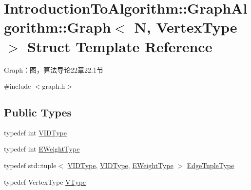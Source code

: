 \hypertarget{struct_introduction_to_algorithm_1_1_graph_algorithm_1_1_graph}{}\section{Introduction\+To\+Algorithm\+:\+:Graph\+Algorithm\+:\+:Graph$<$ N, Vertex\+Type $>$ Struct Template Reference}
\label{struct_introduction_to_algorithm_1_1_graph_algorithm_1_1_graph}


Graph：图，算法导论22章22.1节  




{\ttfamily \#include $<$graph.\+h$>$}

\subsection*{Public Types}
\begin{DoxyCompactItemize}
\item 
typedef int \hyperlink{struct_introduction_to_algorithm_1_1_graph_algorithm_1_1_graph_a60819f2040f2ac261a680db30b0f4409}{V\+I\+D\+Type}
\item 
typedef int \hyperlink{struct_introduction_to_algorithm_1_1_graph_algorithm_1_1_graph_ab398c44ce5ea13c66b38edfcbdd2cdc3}{E\+Weight\+Type}
\item 
typedef std\+::tuple$<$ \hyperlink{struct_introduction_to_algorithm_1_1_graph_algorithm_1_1_graph_a60819f2040f2ac261a680db30b0f4409}{V\+I\+D\+Type}, \hyperlink{struct_introduction_to_algorithm_1_1_graph_algorithm_1_1_graph_a60819f2040f2ac261a680db30b0f4409}{V\+I\+D\+Type}, \hyperlink{struct_introduction_to_algorithm_1_1_graph_algorithm_1_1_graph_ab398c44ce5ea13c66b38edfcbdd2cdc3}{E\+Weight\+Type} $>$ \hyperlink{struct_introduction_to_algorithm_1_1_graph_algorithm_1_1_graph_ad8741e2431522370c7221c0d5633255a}{Edge\+Tuple\+Type}
\item 
typedef Vertex\+Type \hyperlink{struct_introduction_to_algorithm_1_1_graph_algorithm_1_1_graph_a6f480ce7febd625eab0d8600310bae73}{V\+Type}
\end{DoxyCompactItemize}
